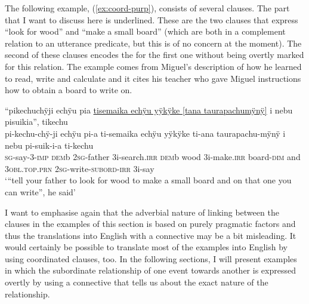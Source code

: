 The following example, (\ref{ex:coord-purp}), consists of several clauses. The part that I want to discuss here is underlined. These are the two clauses that express “look for wood” and “make a small board” (which are both in a complement relation to an utterance predicate, but this is of no concern at the moment). The second of these clauses encodes the  for the first one without being overtly marked for this relation. The example comes from Miguel’s description of how he learned to read, write and calculate and it cites his teacher who gave Miguel instructions how to obtain a board to write on.

\ea\label{ex:coord-purp}
\begingl
\glpreamble “pikechuchÿji echÿu pia \underline{tisemaika echÿu yÿkÿke \textup{[}tana taurapachumÿnÿ\textup{]}} i nebu pisuikia”, tikechu\\
\gla pi-kechu-chÿ-ji echÿu pi-a ti-semaika echÿu yÿkÿke ti-ana taurapachu-mÿnÿ i nebu pi-suik-i-a ti-kechu\\
\textsc{sg}-say-3-\textsc{imp} \textsc{dem}b 2\textsc{sg}-father 3i-search.\textsc{irr} \textsc{dem}b wood 3i-make.\textsc{irr} board-\textsc{dim} and 3\textsc{obl.top.prn} 2\textsc{sg}-write-\textsc{subord}-\textsc{irr} 3i-say\\
\glft ‘“tell your father to look for wood to make a small board and on that one you can write”, he said’
\endgl
\trailingcitation{[mxx-p181027l-1.022]}
\xe

I want to emphasise again that the adverbial nature of linking between the clauses in the examples of this section is based on purely pragmatic factors and thus the translations into English with a connective may be a bit misleading. It would certainly be possible to translate most of the examples into English by using coordinated clauses, too. In the following sections, I will present examples in which the subordinate relationship of one event towards another is expressed overtly by using a connective that tells us about the exact nature of the relationship. %




